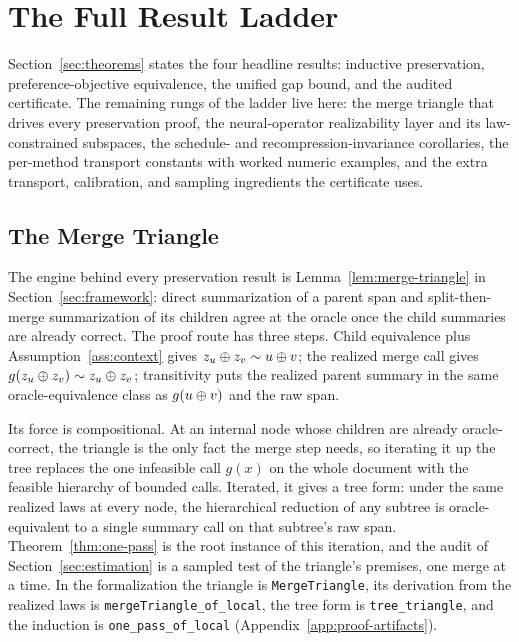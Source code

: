 \section{The Full Result Ladder}\label{app:theory-details}

Section~\ref{sec:theorems} states the four headline results: inductive
preservation, preference-objective equivalence, the unified gap bound,
and the audited certificate. The remaining rungs of the ladder live
here: the merge triangle that drives every preservation proof, the
neural-operator realizability layer and its law-constrained subspaces,
the schedule- and recompression-invariance corollaries, the per-method
transport constants with worked numeric examples, and the extra
transport, calibration, and sampling ingredients the certificate uses.

\subsection{The Merge Triangle}\label{app:merge-triangle}

The engine behind every preservation result is Lemma~\ref{lem:merge-triangle} in Section~\ref{sec:framework}: direct summarization of a parent span and split-then-merge summarization of its children agree at the oracle once the child summaries are already correct. The proof route has three steps. Child equivalence plus Assumption~\ref{ass:context} gives $z_u\oplus z_v \sim u\oplus v$; the realized merge call gives $g(z_u\oplus z_v)\sim z_u\oplus z_v$; transitivity puts the realized parent summary in the same oracle-equivalence class as $g(u\oplus v)$ and the raw span.

Its force is compositional. At an internal node whose children are already oracle-correct, the triangle is the only fact the merge step needs, so iterating it up the tree replaces the one infeasible call $g(x)$ on the whole document with the feasible hierarchy of bounded calls. Iterated, it gives a tree form: under the same realized laws at every node, the hierarchical reduction of any subtree is oracle-equivalent to a single summary call on that subtree's raw span. Theorem~\ref{thm:one-pass} is the root instance of this iteration, and the audit of Section~\ref{sec:estimation} is a sampled test of the triangle's premises, one merge at a time. In the formalization the triangle is \texttt{MergeTriangle}, its derivation from the realized laws is \texttt{mergeTriangle\_of\_local}, the tree form is \texttt{tree\_triangle}, and the induction is \texttt{one\_pass\_of\_local} (Appendix~\ref{app:proof-artifacts}).

